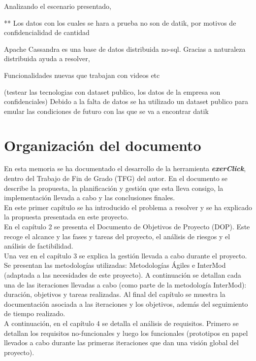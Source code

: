 Analizando el escenario presentado, 

** Los datos con los cuales se hara a prueba no son de datik, por motivos de confidencialidad de cantidad

Apache Cassandra es una base de datos distribuida no-sql. Gracias a naturaleza distribuida ayuda a resolver, 

Funcionalidades nuevas que trabajan con videos etc



(testear las tecnologias con dataset publico, los datos de la empresa son confidenciales) Debido a la falta de datos se ha utilizado un dataset publico para emular las condiciones de futuro con las que se va a encontrar datik

\section{Organización del documento}

En esta memoria se ha documentado  el desarrollo de la herramienta \textbf{\textit{exerClick}}, dentro del Trabajo de Fin de Grado (TFG) del autor. En el documento se describe la propuesta, la planificación y gestión que esta lleva consigo, la implementación llevada a cabo y las conclusiones finales.\\

En este primer capítulo se ha introducido el problema a resolver y se ha explicado la propuesta presentada en este proyecto.\\

En el capítulo 2 se presenta el Documento de Objetivos de Proyecto (DOP). Este recoge el alcance y las fases y tareas del proyecto, el análisis de riesgos y el análisis de factibilidad.\\

Una vez en el capítulo 3 se explica la gestión llevada a cabo durante el proyecto. Se presentan las metodologías utilizadas: Metodologías Ágiles e InterMod (adaptada a las necesidades de este proyecto). A continuación se detallan cada una de las iteraciones llevadas a cabo (como parte de la metodología InterMod): duración, objetivos y tareas realizadas. Al final del capítulo se muestra la documentación asociada a las iteraciones y los objetivos, además del seguimiento de tiempo realizado.\\

A continuación, en el capítulo 4 se detalla el análisis de requisitos. Primero se detallan los requisitos no-funcionales y luego los funcionales (prototipos en papel llevados a cabo durante las primeras iteraciones que dan una visión global del proyecto).\\

